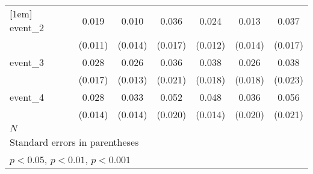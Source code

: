 {\begin{tabular}{l*{6}{c}}
[1em]
event\_2     &       0.019         &       0.010         &       0.036\sym{*}  &       0.024\sym{*}  &       0.013         &       0.037\sym{*}  \\
            &     (0.011)         &     (0.014)         &     (0.017)         &     (0.012)         &     (0.014)         &     (0.017)         \\
[1em]
event\_3     &       0.028         &       0.026         &       0.036         &       0.038\sym{*}  &       0.026         &       0.038         \\
            &     (0.017)         &     (0.013)         &     (0.021)         &     (0.018)         &     (0.018)         &     (0.023)         \\
[1em]
event\_4     &       0.028         &       0.033\sym{*}  &       0.052\sym{**} &       0.048\sym{***}&       0.036         &       0.056\sym{**} \\
            &     (0.014)         &     (0.014)         &     (0.020)         &     (0.014)         &     (0.020)         &     (0.021)         \\
\hline
\(N\)       &                     &                     &                     &                     &                     &                     \\
\hline\hline
\multicolumn{7}{l}{\footnotesize Standard errors in parentheses}\\
\multicolumn{7}{l}{\footnotesize \sym{*} \(p<0.05\), \sym{**} \(p<0.01\), \sym{***} \(p<0.001\)}\\
\end{tabular}
}
